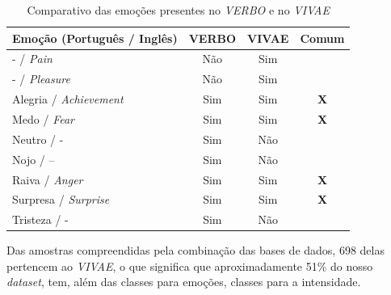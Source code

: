 \begin{table}[!ht]
\centering
\caption{Comparativo das emoções presentes no \textit{VERBO} e no \textit{VIVAE}}
    \begin{tabular}{|l|c|c|c|}
    \hline
        Emoção (Português / Inglês) & VERBO & VIVAE & Comum  \\ \hline
        - / \textit{Pain} & Não & Sim &    \\ \hline
        - / \textit{Pleasure} & Não & Sim &    \\ \hline
        Alegria / \textit{Achievement} & Sim & Sim & \textbf{X}  \\ \hline
        Medo / \textit{Fear} & Sim & Sim & \textbf{X}  \\ \hline
        Neutro / - & Sim & Não &    \\ \hline
        Nojo / – & Sim & Não &    \\ \hline
        Raiva / \textit{Anger} & Sim & Sim & \textbf{X}  \\ \hline
        Surpresa / \textit{Surprise} & Sim & Sim & \textbf{X}  \\ \hline
        Tristeza / - & Sim & Não &    \\ \hline
    \end{tabular}\label{table:verbovsvivae}
\end{table}

Das amostras compreendidas pela combinação das bases de dados, 698 delas pertencem ao \textit{VIVAE}, o que significa que aproximadamente 51\% do nosso \textit{dataset}, tem, além das classes para emoções, classes para a intensidade.

